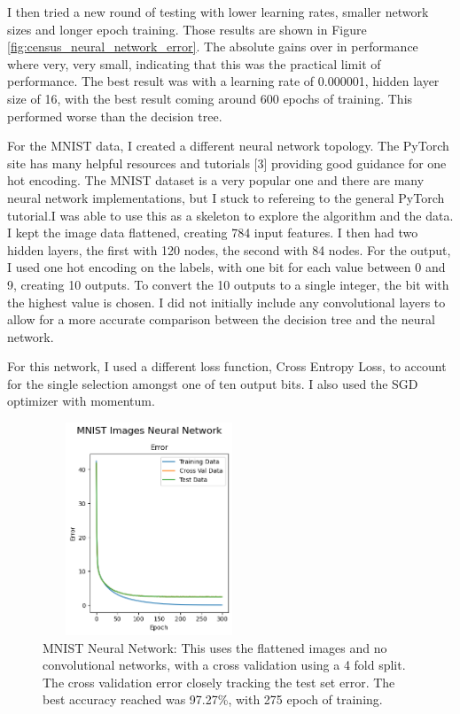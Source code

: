 \documentclass[letterpaper]{article} %
\begin{document}
I then tried a new round of testing with lower learning rates, smaller network sizes and longer epoch training.  Those results are shown in Figure \ref{fig:census_neural_network_error}.  The absolute gains over in performance where very, very small, indicating that this was the practical limit of performance.  The best result was with a learning rate of 0.000001, hidden layer size of 16, with the best result coming around 600 epochs of training.  This performed worse than the decision tree. 

For the MNIST data, I created a different neural network topology.  The PyTorch site has many helpful resources and tutorials [3] providing good guidance for one hot encoding.  The MNIST dataset is a very popular one and there are many neural network implementations, but I stuck to refereing to the general PyTorch tutorial.I was able to use this as a skeleton to explore the algorithm and the data. I kept the image data flattened, creating 784 input features.  I then had two hidden layers, the first with 120 nodes, the second with 84 nodes.  For the output, I used one hot encoding on the labels, with one bit for each value between 0 and 9, creating 10 outputs.  To convert the 10 outputs to a single integer, the bit with the highest value is chosen.  I did not initially include any convolutional layers to allow for a more accurate comparison between the decision tree and the neural network.

For this network, I used a different loss function, Cross Entropy Loss, to account for the single selection amongst one of ten output bits.  I also used the SGD optimizer with momentum. 

\begin{figure}[htb]
\centering
\includegraphics[width=2.5in, height=2.5in]{figures/MNIST_Images_Neural_Network_Error_MNIST.png}
\caption{MNIST Neural Network:  This uses the flattened images and no convolutional networks, with a cross validation using a 4 fold split.  The cross validation error closely tracking the test set error. The best accuracy reached was 97.27\%,  with 275 epoch of training.  }
\label{fig:MNIST_Error_neural_network}
\end{figure}
\end{document}
